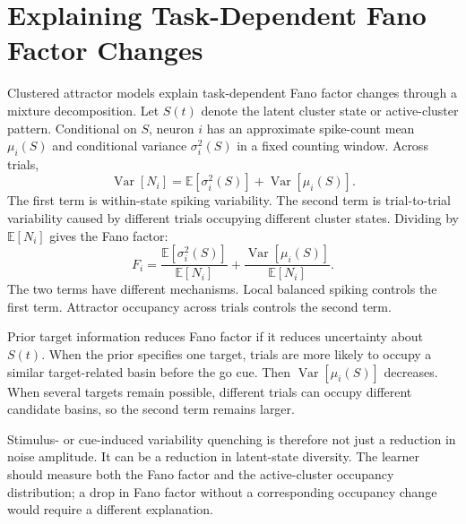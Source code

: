 \section{Explaining Task-Dependent Fano Factor Changes}
\label{sec:explaining-task-dependent-fano-factor-changes}

Clustered attractor models explain task-dependent Fano factor changes through a mixture decomposition. Let $S(t)$ denote the latent cluster state or active-cluster pattern. Conditional on $S$, neuron $i$ has an approximate spike-count mean $\mu_i(S)$ and conditional variance $\sigma_i^2(S)$ in a fixed counting window. Across trials,
%
\begin{equation}
  \operatorname{Var}[N_i]
  =
  \mathbb{E}\!\left[\sigma_i^2(S)\right]
  +
  \operatorname{Var}\!\left[\mu_i(S)\right].
  \label{eq:fano-law-total-variance}
\end{equation}
%
The first term is within-state spiking variability. The second term is trial-to-trial variability caused by different trials occupying different cluster states. Dividing by $\mathbb{E}[N_i]$ gives the Fano factor:
%
\begin{equation}
  F_i
  =
  \frac{\mathbb{E}[\sigma_i^2(S)]}{\mathbb{E}[N_i]}
  +
  \frac{\operatorname{Var}[\mu_i(S)]}{\mathbb{E}[N_i]}.
  \label{eq:fano-decomposition-ch13}
\end{equation}
%
The two terms have different mechanisms. Local balanced spiking controls the first term. Attractor occupancy across trials controls the second term.

Prior target information reduces Fano factor if it reduces uncertainty about $S(t)$. When the prior specifies one target, trials are more likely to occupy a similar target-related basin before the go cue. Then $\operatorname{Var}[\mu_i(S)]$ decreases. When several targets remain possible, different trials can occupy different candidate basins, so the second term remains larger.

Stimulus- or cue-induced variability quenching is therefore not just a reduction in noise amplitude. It can be a reduction in latent-state diversity. The learner should measure both the Fano factor and the active-cluster occupancy distribution; a drop in Fano factor without a corresponding occupancy change would require a different explanation.

